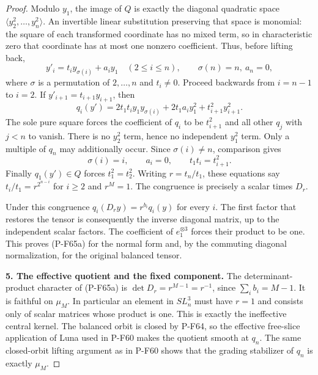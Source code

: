 \begin{proof}
Modulo $y_1$, the image of $Q$ is exactly the diagonal quadratic
space $\langle y_2^2,\ldots,y_n^2\rangle$.
An invertible linear substitution preserving that space is
monomial: the square of each transformed coordinate has no
mixed term, so in characteristic zero that coordinate has at
most one nonzero coefficient.  Thus, before lifting back,
\[
 y'_i=t_i y_{\sigma(i)}+a_i y_1\quad(2\le i\le n),
 \qquad \sigma(n)=n,\ a_n=0,
\]
where $\sigma$ is a permutation of $2,\ldots,n$ and $t_i\ne0$.
Proceed backwards from $i=n-1$ to $i=2$.  If
$y'_{i+1}=t_{i+1}y_{i+1}$, then
\[
 q_i(y')=2t_1t_i y_1y_{\sigma(i)}+2t_1a_i y_1^2
                                  +t_{i+1}^2y_{i+1}^2.
\]
The sole pure square forces the coefficient of $q_i$ to be
$t_{i+1}^2$ and all other $q_j$ with $j<n$ to vanish.
There is no $y_2^2$ term, hence no independent $y_1^2$ term.
Only a multiple of $q_n$ may additionally occur.  Since
$\sigma(i)\ne n$, comparison gives
\[
       \sigma(i)=i,\qquad a_i=0,\qquad t_1t_i=t_{i+1}^2.
\]
Finally $q_1(y')\in Q$ forces $t_1^2=t_2^2$.
Writing $r=t_n/t_1$, these equations say
$t_i/t_1=r^{2^{n-i}}$ for $i\ge2$ and $r^M=1$.
The congruence is precisely a scalar times $D_r$.

Under this congruence $q_i(D_r y)=r^{b_i}q_i(y)$ for every $i$.
The first factor that restores the tensor is consequently the
inverse diagonal matrix, up to the independent scalar factors.
The coefficient of $e_1^{\otimes3}$ forces their product to be
one.  This proves (P-F65a) for the normal form and, by the commuting
diagonal normalization, for the original balanced tensor.

\par\medskip\noindent\textbf{5. The effective quotient and the fixed component.}\quad 
The determinant-product character of (P-F65a) is
$\det D_r=r^{M-1}=r^{-1}$, since
$\sum_i b_i=M-1$.  It is faithful on $\mu_M$.
In particular an element in $SL_n^3$ must have $r=1$ and consists
only of scalar matrices whose product is one.  This is exactly
the ineffective central kernel.  The balanced orbit is closed
by P-F64, so the effective free-slice application of Luna used
in P-F60 makes the quotient smooth at $q_n$.
The same closed-orbit lifting argument as in P-F60 shows that
the grading stabilizer of $q_n$ is exactly $\mu_M$.


\end{proof}

